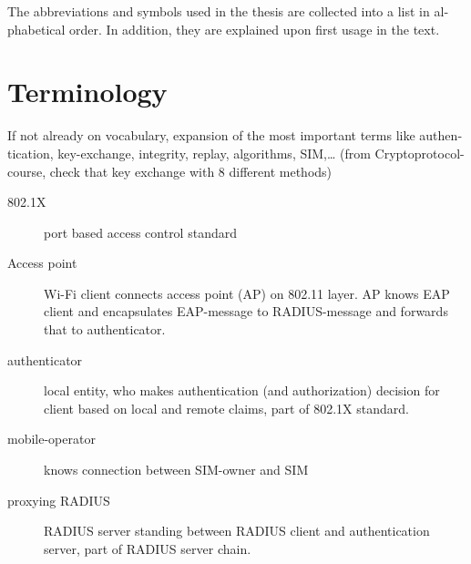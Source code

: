 \documentclass[12pt,a4paper,english]{tutthesis}
\begin{document}
\begin{otherlanguage}{english}
The abbreviations and symbols used in the thesis are collected into a
list in alphabetical order. In addition, they are explained upon
first usage in the text.

\chapter*{Terminology}
\markboth{}{}                                %

If not already on vocabulary, expansion of the most important terms like
authentication, key-exchange, integrity, replay, algorithms, SIM,\ldots{}
(from Cryptoprotocol-course, check that key exchange with 8 different methods)

\begin{description}
\item[{802.1X}] port based access control standard
\item[{Access point}] Wi-Fi client connects access point (AP) on 802.11
layer. AP knows EAP client and encapsulates EAP-message
to RADIUS-message and forwards that to
authenticator.
\end{description}
\begin{description}
\item[{authenticator}] local entity, who makes authentication (and
authorization) decision for client based on local and remote
claims, part of 802.1X standard.
\end{description}
\begin{description}
\item[{mobile-operator}] knows connection between SIM-owner and SIM
\end{description}
\begin{description}
\item[{proxying RADIUS}] RADIUS server standing between RADIUS
client and authentication server, part of RADIUS server chain.
\end{description}



\if@twoside
\cleardoublepage
\fi

\newpage             %
\setcounter{page}{1} %
\renewcommand{\chaptername}{} %


\end{otherlanguage}
\end{document}
